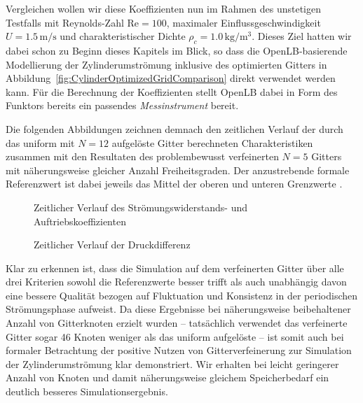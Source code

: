 Vergleichen wollen wir diese Koeffizienten nun im Rahmen des unstetigen Testfalls \cite[2.2b]{SchaeferTurek96} mit Reynolds-Zahl \(\text{Re}=100\), maximaler Einflussgeschwindigkeit \(U = 1.5 \,\text{m}/\text{s}\) und charakteristischer Dichte \(\rho_c = 1.0 \,\text{kg}/\text{m}^3\). Dieses Ziel hatten wir dabei schon zu Beginn dieses Kapitels im Blick, so dass die OpenLB-basierende Modellierung der Zylinderumströmung inklusive des optimierten Gitters in Abbildung~\ref{fig:CylinderOptimizedGridComparison} direkt verwendet werden kann. Für die Berechnung der Koeffizienten stellt OpenLB dabei in Form des  Funktors bereits ein passendes \emph{Messinstrument} bereit.

\newpage
Die folgenden Abbildungen zeichnen demnach den zeitlichen Verlauf der durch das uniform mit \(N=12\) aufgelöste Gitter berechneten Charakteristiken zusammen mit den Resultaten des problembewusst verfeinerten \(N=5\) Gitters mit näherungsweise gleicher Anzahl Freiheitsgraden. Der anzustrebende formale Referenzwert ist dabei jeweils das Mittel der oberen und unteren Grenzwerte \cite[Tabelle~4]{SchaeferTurek96}.

\bigskip

\begin{figure}[H]
\centering

\caption{Zeitlicher Verlauf des Strömungswiderstands- und Auftriebskoeffizienten}
\end{figure}

\begin{figure}[H]
\centering

\caption{Zeitlicher Verlauf der Druckdifferenz}
\end{figure}

Klar zu erkennen ist, dass die Simulation auf dem verfeinerten Gitter über alle drei Kriterien sowohl die Referenzwerte besser trifft als auch unabhängig davon eine bessere Qualität bezogen auf Fluktuation und Konsistenz in der periodischen Strömungsphase aufweist. Da diese Ergebnisse bei näherungsweise beibehaltener Anzahl von Gitterknoten erzielt wurden -- tatsächlich verwendet das verfeinerte Gitter sogar 46 Knoten weniger als das uniform aufgelöste -- ist somit auch bei formaler Betrachtung der positive Nutzen von Gitterverfeinerung zur Simulation der Zylinderumströmung klar demonstriert. Wir erhalten bei leicht geringerer Anzahl von Knoten und damit näherungsweise gleichem Speicherbedarf ein deutlich besseres Simulationsergebnis.

